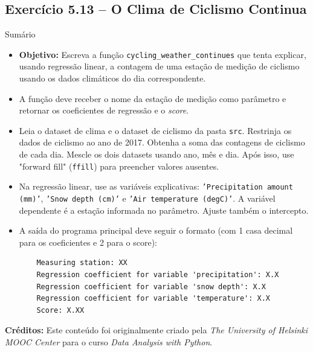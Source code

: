 \documentclass[11pt,a4paper]{article}
\begin{document}
\subsection*{Exercício 5.13 -- O Clima de Ciclismo Continua}
\begin{exercicio}{Sumário}
\begin{itemize}
    \item \textbf{Objetivo:} Escreva a função \texttt{cycling\_weather\_continues} que tenta explicar, usando regressão linear, a contagem de uma estação de medição de ciclismo usando os dados climáticos do dia correspondente.
    \item A função deve receber o nome da estação de medição como parâmetro e retornar os coeficientes de regressão e o \textit{score}.
    \item Leia o dataset de clima e o dataset de ciclismo da pasta \texttt{src}. Restrinja os dados de ciclismo ao ano de 2017. Obtenha a soma das contagens de ciclismo de cada dia. Mescle os dois datasets usando ano, mês e dia. Após isso, use "forward fill" (\texttt{ffill}) para preencher valores ausentes.
    \item Na regressão linear, use as variáveis explicativas: \texttt{'Precipitation amount (mm)'}, \texttt{'Snow depth (cm)'} e \texttt{'Air temperature (degC)'}. A variável dependente é a estação informada no parâmetro. Ajuste também o intercepto.
    \item A saída do programa principal deve seguir o formato (com 1 casa decimal para os coeficientes e 2 para o score):
    \begin{verbatim}
    Measuring station: XX
    Regression coefficient for variable 'precipitation': X.X
    Regression coefficient for variable 'snow depth': X.X
    Regression coefficient for variable 'temperature': X.X
    Score: X.XX
    \end{verbatim}
\end{itemize}
\end{exercicio}

\vspace{2em}
\noindent\textbf{Créditos:} Este conteúdo foi originalmente criado pela \textit{The University of Helsinki MOOC Center} para o curso \textit{Data Analysis with Python}.
\end{document}
